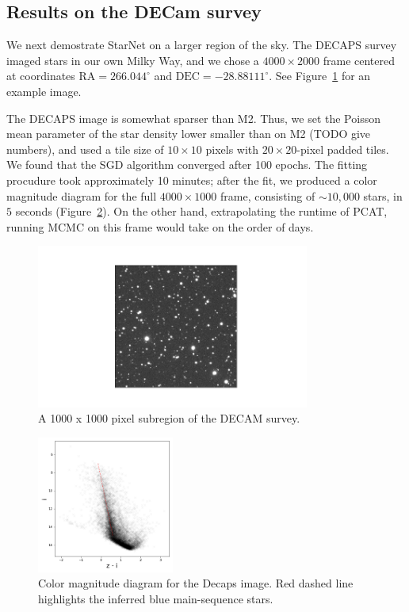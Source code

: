 \subsection{Results on the DECam survey}
\label{sec:results_on_decam}

We next demostrate StarNet on a larger region of the sky.
The DECAPS survey imaged stars in our own Milky Way, and we chose
a $4000 \times 2000$ frame centered at coordinates $\text{RA} = 266.044^\circ$ and
$\text{DEC} = -28.88111^\circ$. See Figure~\ref{fig:decaps_ex} for an example image.

The DECAPS image is somewhat sparser than M2.
Thus, we set the Poisson mean parameter of the star density lower
smaller than on M2 (TODO give numbers), and
used a tile size of $10\times 10$ pixels with $20\times20$-pixel
padded tiles. We found that the SGD algorithm converged after
100 epochs.
The fitting procudure took approximately 10 minutes; after the fit,
we produced
a color magnitude diagram for the full $4000 \times 1000$ frame,
consisting of $\sim 10,000$ stars, in $5$ seconds (Figure~\ref{fig:decaps_cmd}).
On the other hand, extrapolating the runtime of PCAT, running MCMC on this frame
would take on the order of days.


\begin{figure}[tb]
    \centering
    \includegraphics[width=0.8\textwidth]{./figures/decaps/example_subimage1000_decaps.png}
    \vspace{-0.4cm}
    \caption{A 1000 x 1000 pixel subregion of the DECAM survey. }
    \label{fig:decaps_ex}
\end{figure}

\begin{figure}[tb]
    \centering
    \includegraphics[width=0.4\textwidth]{./figures/decaps/decaps_cmd.png}
    \vspace{-0.4cm}
    \caption{Color magnitude diagram for the Decaps image. Red dashed line highlights
    the inferred blue main-sequence stars.
    }
    \label{fig:decaps_cmd}
\end{figure}
